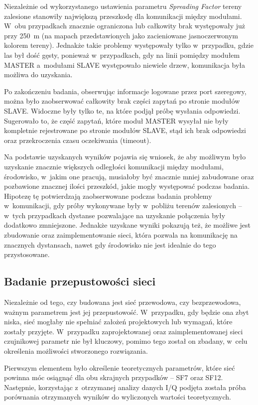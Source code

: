 Niezależnie od wykorzystanego ustawienia parametru \textsl{Spreading Factor} tereny zalesione stanowiły największą przeszkodę dla
komunikacji między modułami. W~obu przypadkach znacznie ograniczona lub całkowity brak występowały już przy 250~m (na
mapach przedstawionych jako zacieniowane jasnoczerwonym kolorem tereny). Jednakże takie problemy występowały tylko
w~przypadku, gdzie las był dość gęsty, ponieważ w~przypadkach, gdy na linii pomiędzy modułem MASTER a~modułami SLAVE
występowało niewiele drzew, komunikacja była możliwa do uzyskania.

Po zakończeniu badania, obserwując informacje logowane przez port szeregowy, można było zaobserwować całkowity brak
części zapytań po stronie modułów SLAVE. Widoczne były tylko te, na które podjął próbę wysłania odpowiedzi. Sugerowało
to, że część zapytań, które moduł MASTER wysyłał nie były kompletnie rejestrowane po stronie modułów SLAVE, stąd ich
brak odpowiedzi oraz przekroczenia czasu oczekiwania (timeout).

Na podstawie uzyskanych wyników pojawia się wniosek, że aby możliwym było uzyskanie znacznie większych odległości
komunikacji między modułami, środowisko, w~jakim one pracują, musiałoby być znacznie mniej zabudowane oraz pozbawione
znacznej ilości przeszkód, jakie mogły występować podczas badania. Hipotezę tę potwierdzają zaobserwowane podczas
badania problemy w~komunikacji, gdy próby wykonywane były w~pobliżu terenów zalesionych -- w~tych przypadkach dystanse
pozwalające na uzyskanie połączenia były dodatkowo zmniejszone. Jednakże uzyskane wyniki pokazują też, że możliwe jest
zbudowanie oraz zaimplementowanie sieci, która pozwala na komunikację na znacznych dystansach, nawet gdy środowisko nie
jest idealnie do tego przystosowane.

\subsection{\label{sect:network-communication-bitrate}Badanie przepustowości sieci} Niezależnie od tego, czy budowana
jest sieć przewodowa, czy bezprzewodowa, ważnym parametrem jest jej przepustowość. W~przypadku, gdy będzie ona zbyt
niska, sieć mogłaby nie spełniać założeń projektowych lub wymagań, które zostały przyjęte. W~przypadku zaprojektowanej
oraz zaimplementowanej sieci czujnikowej parametr nie był kluczowy, pomimo tego został on zbadany, w~celu określenia
możliwości stworzonego rozwiązania.

Pierwszym elementem było określenie teoretycznych parametrów, które sieć powinna móc osiągnąć dla obu skrajnych
przypadków -- SF7 oraz SF12. Następnie, korzystając z~otrzymanej analizy danych I/Q podjęta została próba porównania
otrzymanych wyników do wyliczonych wartości teoretycznych.

